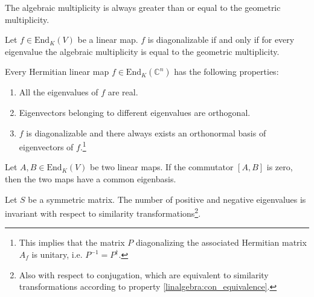     \begin{property}
        The algebraic multiplicity is always greater than or equal to the geometric multiplicity.
    \end{property}
    \begin{theorem}\label{linalgebra:theorem:diagonalizable_multiplicity}
        Let $f\in\text{End}_K(V)$ be a linear map. $f$ is diagonalizable if and only if for every eigenvalue the algebraic multiplicity is equal to the geometric multiplicity.
    \end{theorem}

    \begin{property}\label{linalgebra:diagonalizable_hermitian}
        Every Hermitian linear map $f\in\text{End}_K(\mathbb{C}^n)$ has the following properties:
        \begin{enumerate}
            \item All the eigenvalues of $f$ are real.
            \item Eigenvectors belonging to different eigenvalues are orthogonal.
            \item $f$ is diagonalizable and there always exists an orthonormal basis of eigenvectors of $f$.\footnote{This implies that the matrix $P$ diagonalizing the associated Hermitian matrix $A_f$ is unitary, i.e. $P^{-1} = P^\dag$.}
        \end{enumerate}
    \end{property}

    \begin{property}
        Let $A,B\in\text{End}_K(V)$ be two linear maps. If the commutator $[A, B]$ is zero, then the two maps have a common eigenbasis.
    \end{property}

    \begin{theorem}
        Let $S$ be a symmetric matrix. The number of positive and negative eigenvalues is invariant with respect to similarity transformations\footnote{Also with respect to conjugation, which are equivalent to similarity transformations according to property \ref{linalgebra:con_equivalence}.}.
    \end{theorem}